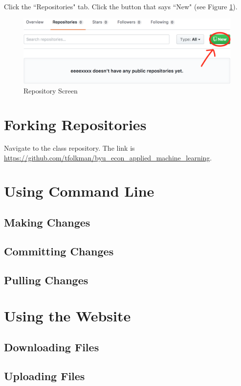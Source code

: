 \documentclass[11pt,a4paper]{article}
\begin{document}
Click the ``Repositories" tab.
Click the button that says ``New" (see Figure \ref{fig:repo}).

\begin{figure}[h]
\centering
\includegraphics[width=.7\textwidth]{figures/repository_page.png}
\caption{Repository Screen}
\label{fig:repo}
\end{figure}


\section*{Forking Repositories}
Navigate to the class repository. 
The link is \url{https://github.com/tfolkman/byu_econ_applied_machine_learning}.

\section*{Using Command Line}
\subsection*{Making Changes}

\subsection*{Committing Changes}

\subsection*{Pulling Changes}

\section*{Using the Website}
\subsection*{Downloading Files}

\subsection*{Uploading Files}
\end{document}
